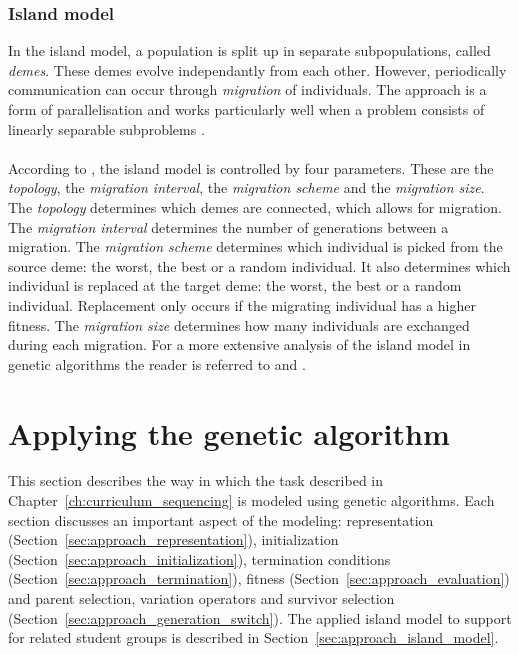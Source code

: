 \subsubsection{Island model}
In the island model, a population is split up in separate subpopulations,
called \emph{demes}. These demes evolve independantly from each other.
However, periodically communication can occur through \emph{migration} of
individuals. The approach is a form of parallelisation and works particularly
well when a problem consists of linearly separable subproblems
\citep{Whitley1999}.\\\\
\noindent
According to \citep{Nowostawski1999}, the island model is controlled by
four parameters. These are the \emph{topology}, the \emph{migration interval}, the
\emph{migration scheme} and the \emph{migration size}. The \emph{topology}
determines which demes are connected, which allows for migration. The
\emph{migration interval} determines the number of generations between a
migration. The \emph{migration scheme} determines which individual is picked
from the source deme: the worst, the best or a random individual. It also
determines which individual is replaced at the target deme: the worst, the best
or a random individual. Replacement only occurs if the migrating individual has a higher fitness. The \emph{migration size} determines how many individuals are
exchanged during each migration. For a more extensive analysis of the island model in genetic algorithms the reader is referred to \citep{Martin1997} and \citep{Whitley1999}.

\section{Applying the genetic algorithm}
\label{sec:approach_application}
This section describes the way in which the task described in
Chapter~\ref{ch:curriculum_sequencing} is modeled using genetic algorithms.
Each section discusses an important aspect of the modeling: representation
(Section~\ref{sec:approach_representation}), initialization
(Section~\ref{sec:approach_initialization}), termination conditions
(Section~\ref{sec:approach_termination}), fitness
(Section~\ref{sec:approach_evaluation}) and parent selection, variation
operators and survivor selection
(Section~\ref{sec:approach_generation_switch}). The applied island model to
support for related student groups is described in
Section~\ref{sec:approach_island_model}.

